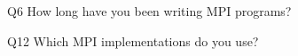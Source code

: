 \begin{description}%
\item{Q6} How long have you been writing MPI programs?%
\item{Q12} Which MPI implementations do you use?%
\end{description}%
